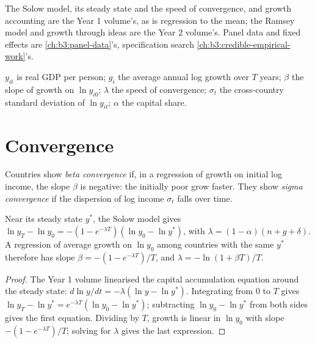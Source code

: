\begin{recall}
The Solow model, its steady state and the speed of convergence, and growth
accounting are the Year 1 volume's, as is regression to the mean; the Ramsey model and
growth through ideas are the Year 2 volume's. Panel data and fixed effects are
\cref{ch:b3:panel-data}'s, specification search \cref{ch:b3:credible-empirical-work}'s.
\end{recall}

\begin{notation}\label{not:b3:growth-empirics:symbols}
$y_{it}$ is real GDP per person; $g_i$ the average annual log growth over $T$ years; $\beta$ the slope of
growth on $\ln y_{i0}$; $\lambda$ the speed of convergence; $\sigma_t$ the cross-country standard deviation of $\ln y_{it}$; $\alpha$
the capital share.
\end{notation}

\section{Convergence}\label{sec:b3:growth-empirics:convergence}

\begin{definition}\label{def:b3:growth-empirics:convergence}
Countries show \emph{beta convergence} if, in a regression of growth on initial log
income, the slope $\beta$ is negative: the initially poor grow faster. They show \emph{sigma
convergence} if the dispersion of log income $\sigma_t$ falls over time.
\end{definition}

\begin{proposition}\label{prop:b3:growth-empirics:speed}
Near its steady state $y^*$, the Solow model gives $\ln y_T - \ln y_0 = -(1 - e^{-\lambda T})(\ln y_0 - \ln y^*)$, with $\lambda = (1 - \alpha)(n + g + \delta)$. A
regression of average growth on $\ln y_0$ among countries with the same $y^*$ therefore has slope
$\beta = -(1 - e^{-\lambda T})/T$, and $\lambda = -\ln(1 + \beta T)/T$.
\end{proposition}

\begin{proof}
The Year 1 volume linearised the capital accumulation equation around the steady
state: $d\ln y/dt = -\lambda(\ln y - \ln y^*)$. Integrating from 0 to $T$ gives $\ln y_T - \ln y^* = e^{-\lambda T}(\ln y_0 - \ln y^*)$; subtracting $\ln y_0 - \ln y^*$ from both
sides gives the first equation. Dividing by $T$, growth is linear in $\ln y_0$ with slope $-(1 - e^{-\lambda T})/T$;
solving for $\lambda$ gives the last expression.
\end{proof}

